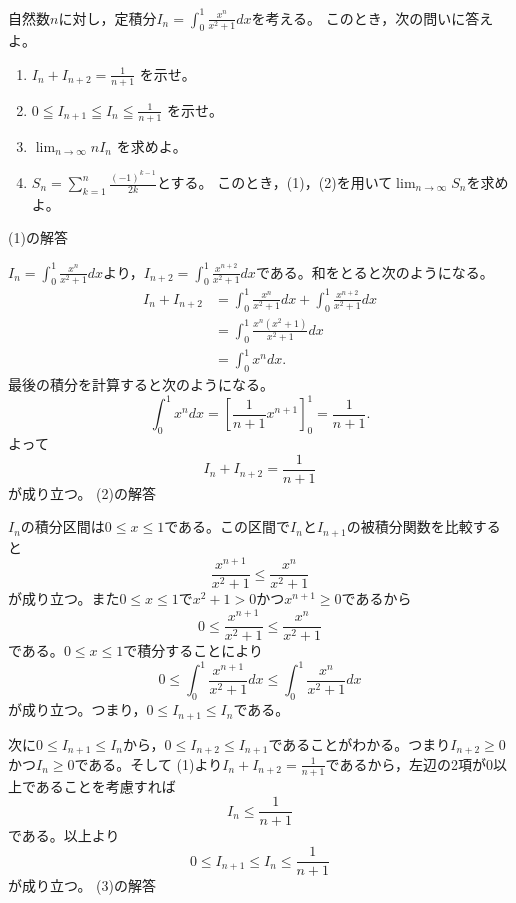 \documentclass[11pt,a4paper]{jsarticle}
\begin{document}
\noindent
自然数$n$に対し，定積分$\displaystyle I_{n}=\int_{0}^{1} \frac{x^{n}}{x^{2}+1} d x$を考える。
このとき，次の問いに答えよ。
\begin{enumerate}[(1)]
 \item $\displaystyle I_{n}+I_{n+2}=\frac{1}{n+1}$ を示せ。
 \item $\displaystyle 0 \leqq I_{n+1} \leqq I_{n} \leqq \frac{1}{n+1}$ を示せ。
 \item $\displaystyle \lim _{n \rightarrow \infty} n I_{n}$ を求めよ。
 \item $\displaystyle S_{n}=\sum_{k=1}^{n} \frac{(-1)^{k-1}}{2 k}$とする。
 このとき，(1)，(2)を用いて$\displaystyle \lim _{n \rightarrow \infty} S_{n}$を求めよ。
\end{enumerate}


\noindent
(1)の解答

$I_{n}=\int_{0}^{1} \frac{x^{n}}{x^{2}+1} d x$より，$I_{n+2}=\int_{0}^{1} \frac{x^{n+2}}{x^{2}+1} d x$である。和をとると次のようになる。
\[\begin{aligned}
I_{n}+I_{n+2} &=\int_{0}^{1} \frac{x^{n}}{x^{2}+1} d x+\int_{0}^{1} \frac{x^{n+2}}{x^{2}+1} d x \\
&=\int_{0}^{1} \frac{x^{n}\left(x^{2}+1\right)}{x^{2}+1} d x \\
&=\int_{0}^{1} x^{n} d x.
\end{aligned}\]
最後の積分を計算すると次のようになる。
\[\int_{0}^{1} x^{n} d x=\left[\frac{1}{n+1} x^{n+1}\right]_{0}^{1}=\frac{1}{n+1}.\]
よって
\[I_{n}+I_{n+2}=\frac{1}{n+1}\]
が成り立つ。
\noindent
(2)の解答

$I_n$の積分区間は$0\leq x\leq 1$である。この区間で$I_n$と$I_{n+1}$の被積分関数を比較すると
\[\frac{x^{n+1}}{x^{2}+1} \leq \frac{x^{n}}{x^{2}+1}\]
が成り立つ。また$0\leq x\leq 1$で$x^2+1>0$かつ$x^{n+1}\geq 0$であるから
\[0 \leq \frac{x^{n+1}}{x^{2}+1} \leq \frac{x^{n}}{x^{2}+1}\]
である。$0\leq x\leq 1$で積分することにより
\[0 \leq \int_{0}^{1} \frac{x^{n+1}}{x^{2}+1} d x \leq \int_{0}^{1} \frac{x^{n}}{x^{2}+1} d x\]
が成り立つ。つまり，$0\leq I_{n+1}\leq I_{n}$である。

次に$0\leq I_{n+1}\leq I_{n}$から，$0\leq I_{n+2}\leq I_{n+1}$であることがわかる。つまり$I_{n+2}\geq 0$かつ$I_{n}\geq 0$である。そして (1)より$I_{n}+I_{n+2}=\frac{1}{n+1}$であるから，左辺の2項が0以上であることを考慮すれば
\[I_{n} \leq \frac{1}{n+1}\]
である。以上より
\[0 \leq I_{n+1} \leq I_{n} \leq \frac{1}{n+1}\]
が成り立つ。
\noindent
(3)の解答
\end{document}

